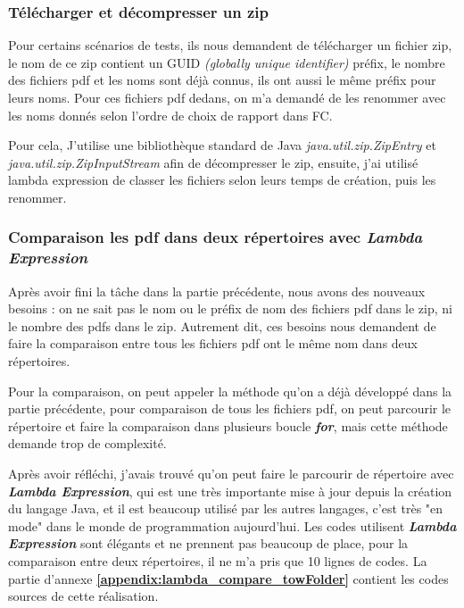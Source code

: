     \subsubsection{Télécharger et décompresser un zip}
    Pour certains scénarios de tests, ils nous demandent de télécharger un fichier zip, le nom de ce zip contient un GUID \textit{(globally unique identifier)} préfix, le nombre des fichiers pdf et les noms sont déjà connus, ils ont aussi le même préfix pour leurs noms. Pour ces  fichiers pdf dedans, on m'a demandé de les renommer avec les noms donnés selon l'ordre de choix de rapport dans FC.
    
    \par Pour cela, J'utilise une bibliothèque standard de Java  \textit{java.util.zip.ZipEntry} et  \textit{java.util.zip.ZipInputStream} afin de décompresser le zip, ensuite, j'ai utilisé lambda expression de classer les fichiers selon leurs temps de création, puis les renommer.
    
    \subsubsection{Comparaison les pdf dans deux répertoires avec \textbf{\textit{Lambda Expression}}}
    Après avoir fini la tâche dans la partie précédente, nous avons des nouveaux besoins : on ne sait pas le nom ou le préfix de nom des fichiers pdf dans le zip, ni le nombre des pdfs dans le zip. Autrement dit, ces besoins nous demandent de faire la comparaison entre tous les fichiers pdf ont le même nom dans deux répertoires. 
    
    \par Pour la comparaison, on peut appeler la méthode qu'on a déjà développé dans la partie précédente, pour comparaison de tous les fichiers pdf, on peut parcourir le répertoire et faire la comparaison dans plusieurs boucle \textit{\textbf{for}}, mais cette méthode demande trop de complexité. 
    
    \par Après avoir réfléchi, j'avais trouvé qu'on peut faire le parcourir de répertoire avec \textit{\textbf{Lambda Expression}}, qui est une très importante mise à jour depuis la création du langage Java, et il est beaucoup utilisé par les autres langages, c'est très "en mode" dans le monde de programmation aujourd'hui. Les codes utilisent \textbf{\textit{Lambda Expression}} sont élégants et ne prennent pas beaucoup de place, pour la comparaison entre deux répertoires, il ne m'a pris que 10 lignes de codes. La partie d'annexe \textbf{\ref{appendix:lambda_compare_towFolder}} contient les codes sources de cette réalisation. 
    
